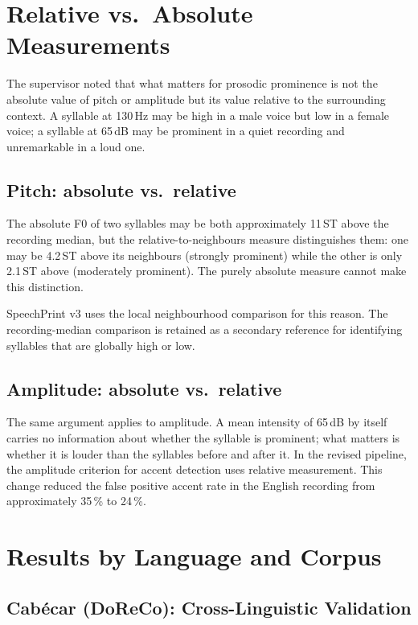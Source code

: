 \normallinespacing

\section{Relative vs.\ Absolute Measurements}
\label{sec:relative_vs_absolute}

The supervisor noted that what matters for prosodic prominence is not the absolute value of pitch or amplitude but its value relative to the surrounding context. A syllable at 130\,Hz may be high in a male voice but low in a female voice; a syllable at 65\,dB may be prominent in a quiet recording and unremarkable in a loud one.

\subsection{Pitch: absolute vs.\ relative}

The absolute F0 of two syllables may be both approximately 11\,ST above the recording median, but the relative-to-neighbours measure distinguishes them: one may be 4.2\,ST above its neighbours (strongly prominent) while the other is only 2.1\,ST above (moderately prominent). The purely absolute measure cannot make this distinction.

SpeechPrint v3 uses the local neighbourhood comparison for this reason. The recording-median comparison is retained as a secondary reference for identifying syllables that are globally high or low.

\subsection{Amplitude: absolute vs.\ relative}

The same argument applies to amplitude. A mean intensity of 65\,dB by itself carries no information about whether the syllable is prominent; what matters is whether it is louder than the syllables before and after it. In the revised pipeline, the amplitude criterion for accent detection uses relative measurement. This change reduced the false positive accent rate in the English recording from approximately 35\,\% to 24\,\%.

\section{Results by Language and Corpus}
\label{sec:results_by_language}

\subsection{Cabécar (DoReCo): Cross-Linguistic Validation}
\label{sec:cabeca_results}

